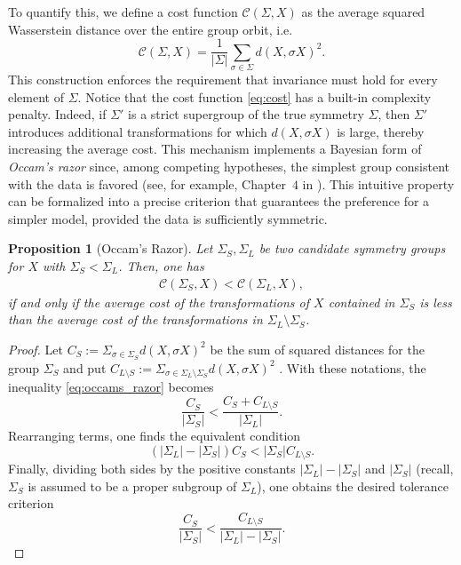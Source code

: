 \documentclass[11pt]{amsart}
\newtheorem{proposition}{Proposition}[section]
\begin{document}
To quantify this, we define a cost function $\mathcal{C}(\Sigma,X)$ as the average squared Wasserstein distance over the entire group orbit, i.e.
\begin{equation}\label{eq:cost}
    \mathcal{C}(\Sigma,X) = \frac{1}{|\Sigma|} \sum_{\sigma \in \Sigma} d(X,\sigma X)^2.
\end{equation}
This construction enforces the requirement that invariance must hold for every element of $\Sigma$. Notice that the cost function \eqref{eq:cost} has a built-in complexity penalty. Indeed, if $\Sigma'$ is a strict supergroup of the true symmetry $\Sigma$, then $\Sigma'$ introduces additional transformations for which $d(X,\sigma X)$ is large, thereby increasing the average cost. This mechanism implements a Bayesian form of \emph{Occam's razor} since, among competing hypotheses, the simplest group consistent with the data is favored (see, for example, Chapter~$4$ in \cite{Mackay2003}). This intuitive property can be formalized into a precise criterion that guarantees the preference for a simpler model, provided the data is sufficiently symmetric.
\begin{proposition}[Occam's Razor]\label{prop:occams_razor}
    Let $\Sigma_S, \Sigma_L$ be two candidate symmetry groups for $X$ with $\Sigma_S < \Sigma_L$. Then, one has
\begin{align}\label{eq:occams_razor}
        \mathcal C(\Sigma_S,X) < \mathcal C(\Sigma_L, X),
    \end{align}
if and only if the average cost of the transformations of $X$ contained in $\Sigma_S$ is less than the average cost of the transformations in $\Sigma_L \setminus \Sigma_S$.
\end{proposition}
\begin{proof}
    Let $C_S := \Sigma_{\sigma \in \Sigma_S} d(X,\sigma X)^2$ be the sum of squared distances for the group $\Sigma_S$ and put $C_{L\setminus S} := \Sigma_{\sigma \in \Sigma_L \setminus \Sigma_S} d(X,\sigma X)^2$ . With these notations, the inequality \eqref{eq:occams_razor} becomes
    \[
    \frac{C_S}{|\Sigma_S|} < \frac{C_S + C_{L\setminus S}}{|\Sigma_L|}.
    \]
Rearranging terms, one finds the equivalent condition
\[
(|\Sigma_L| - |\Sigma_S|) C_S < |\Sigma_S| C_{L \setminus S}.
\]
Finally, dividing both sides by the positive constants $|\Sigma_L| - |\Sigma_S|$ and $|\Sigma_S|$ (recall, $\Sigma_S$ is assumed to be a proper subgroup of $\Sigma_L$), one obtains the desired tolerance criterion
\[
\frac{C_S}{ |\Sigma_S|} < \frac{C_{L \setminus S}}{|\Sigma_L| - |\Sigma_S|}.
\]
\end{proof}
\end{document}
